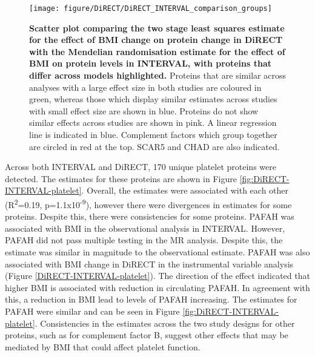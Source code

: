 \documentclass[11pt,twoside]{bristolthesis}
\newcommand{\blandscape}{\begin{landscape}}
\newcommand{\elandscape}{\end{landscape}}
\begin{document}
\blandscape



\begin{figure}

{\centering \texttt{[image: figure/DiRECT/DiRECT\_INTERVAL\_comparison\_groups]} 

}

\caption[Scatter plot comparing the two stage least squares estimate for the effect of BMI change on protein change in DiRECT with the Mendelian randomisation estimate for the effect of BMI on protein levels in INTERVAL, with proteins that differ across models highlighted]{\textbf{Scatter plot comparing the two stage least squares estimate for the effect of BMI change on protein change in DiRECT with the Mendelian randomisation estimate for the effect of BMI on protein levels in INTERVAL, with proteins that differ across models highlighted.} Proteins that are similar across analyses with a large effect size in both studies are coloured in green, whereas those which display similar estimates across studies with small effect size are shown in blue. Proteins do not show similar effects across studies are shown in pink. A linear regression line is indicated in blue. Complement factors which group together are circled in red at the top. SCAR5 and CHAD are also indicated.}\label{fig:DiRECT-INTERVAL-group}
\end{figure}
\elandscape

Across both INTERVAL and DiRECT, 170 unique platelet proteins were detected. The estimates for these proteins are shown in Figure \ref{fig:DiRECT-INTERVAL-platelet}. Overall, the estimates were associated with each other (R\textsuperscript{2}=0.19, p=1.1x10\textsuperscript{-9}), however there were divergences in estimates for some proteins. Despite this, there were consistencies for some proteins. PAFAH was associated with BMI in the observational analysis in INTERVAL. However, PAFAH did not pass multiple testing in the MR analysis. Despite this, the estimate was similar in magnitude to the observational estimate. PAFAH was also associated with BMI change in DiRECT in the instrumental variable analysis (Figure \ref{DiRECT-INTERVAL-platelet}). The direction of the effect indicated that higher BMI is associated with reduction in circulating PAFAH. In agreement with this, a reduction in BMI lead to levels of PAFAH increasing. The estimates for PAFAH were similar and can be seen in Figure \ref{fig:DiRECT-INTERVAL-platelet}. Consistencies in the estimates across the two study designs for other proteins, such as for complement factor B, suggest other effects that may be mediated by BMI that could affect platelet function.
\end{document}
